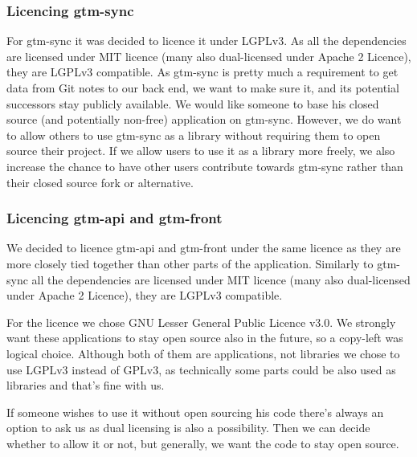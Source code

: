 \subsubsection{Licencing gtm-sync}\label{subsubsec:licencing-gtm-sync}
For gtm-sync it was decided to licence it under LGPLv3.
As all the dependencies are licensed under MIT licence (many also dual-licensed under Apache 2 Licence), they are LGPLv3 compatible.
As gtm-sync is pretty much a requirement to get data from Git notes to our back end, we want to make sure it,
and its potential successors stay publicly available.
We would like someone to base his closed source (and potentially non-free) application on gtm-sync.
However, we do want to allow others to use gtm-sync as a library without requiring them to open source their project.
If we allow users to use it as a library more freely, we also increase the chance to have other users contribute towards gtm-sync
rather than their closed source fork or alternative.

\subsubsection{Licencing gtm-api and gtm-front}\label{subsubsec:licencing-gtm-api-and-gtm-front}
We decided to licence gtm-api and gtm-front under the same licence as they are more closely tied together than other parts of the application.
Similarly to gtm-sync all the dependencies are licensed under MIT licence (many also dual-licensed under Apache 2 Licence), they are LGPLv3 compatible.

For the licence we chose GNU Lesser General Public Licence v3.0.
We strongly want these applications to stay open source also in the future, so a copy-left was logical choice.
Although both of them are applications, not libraries we chose to use LGPLv3 instead of GPLv3, as technically some parts
could be also used as libraries and that's fine with us.

If someone wishes to use it without open sourcing his code there's always an option to ask us as dual licensing is also a possibility.
Then we can decide whether to allow it or not, but generally, we want the code to stay open source.
